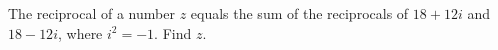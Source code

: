 The reciprocal of a number $z$ equals the sum of the reciprocals of $18+12i$ and $18-12i$, where $i^2=-1$. Find $z$.
